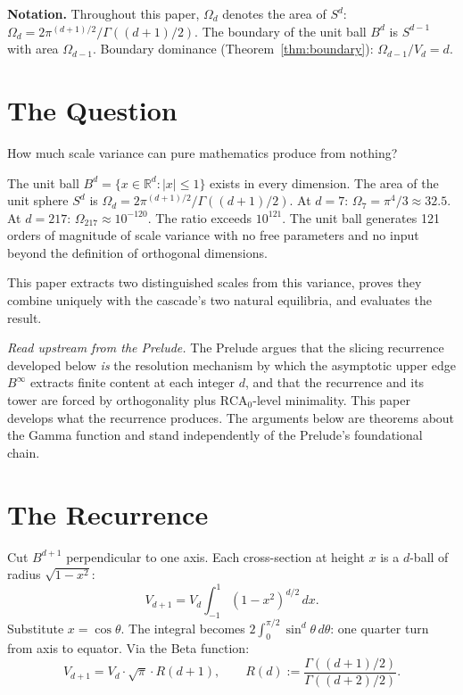 \documentclass[11pt,a4paper]{article}
\begin{document}
\medskip\noindent\textbf{Notation.}
Throughout this paper, $\Omega_d$ denotes the area of $S^d$:
$\Omega_d = 2\pi^{(d+1)/2}/\Gamma((d+1)/2)$. The boundary of the unit
ball $B^d$ is $S^{d-1}$ with area $\Omega_{d-1}$. Boundary dominance
(Theorem~\ref{thm:boundary}): $\Omega_{d-1}/V_d = d$.

\section{The Question}\label{sec:the-question}

How much scale variance can pure mathematics produce from nothing?

The unit ball $B^d = \{x\in\mathbb{R}^d : |x|\leq 1\}$ exists in every
dimension. The area of the unit sphere $S^d$ is
$\Omega_d = 2\pi^{(d+1)/2}/\Gamma((d+1)/2)$. At $d = 7$:
$\Omega_7 = \pi^4/3\approx 32.5$. At $d = 217$:
$\Omega_{217}\approx 10^{-120}$. The ratio exceeds $10^{121}$. The unit
ball generates 121 orders of magnitude of scale variance with no free
parameters and no input beyond the definition of orthogonal dimensions.

This paper extracts two distinguished scales from this variance, proves
they combine uniquely with the cascade's two natural equilibria, and evaluates
the result.

\medskip
\noindent\emph{Read upstream from the Prelude.} The Prelude argues that
the slicing recurrence developed below \emph{is} the resolution mechanism
by which the asymptotic upper edge $B^\infty$ extracts finite content at
each integer $d$, and that the recurrence and its tower are forced by
orthogonality plus $\mathrm{RCA}_0$-level minimality. This paper develops
what the recurrence produces. The arguments below are theorems about the
Gamma function and stand independently of the Prelude's foundational
chain.

\section{The Recurrence}\label{sec:recurrence}

Cut $B^{d+1}$ perpendicular to one axis. Each cross-section at height $x$
is a $d$-ball of radius $\sqrt{1-x^2}$:
\begin{equation}\label{eq:slice}
V_{d+1} = V_d\int_{-1}^{1}(1-x^2)^{d/2}\,dx.
\end{equation}
Substitute $x = \cos\theta$. The integral becomes
$2\int_0^{\pi/2}\sin^d\theta\,d\theta$: one quarter turn from axis to
equator. Via the Beta function:
\begin{equation}\label{eq:recurrence}
V_{d+1} = V_d\cdot\sqrt{\pi}\cdot R(d+1), \qquad
R(d) := \frac{\Gamma((d+1)/2)}{\Gamma((d+2)/2)}.
\end{equation}
\end{document}
